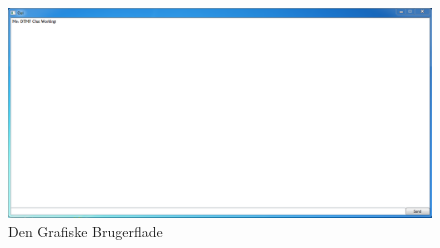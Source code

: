 \begin{figure}[h!]
\centering
\includegraphics[scale=0.5]{Billeder/GUI.PNG}
\caption{Den Grafiske Brugerflade}
\label{fig:GUI}
\end{figure}